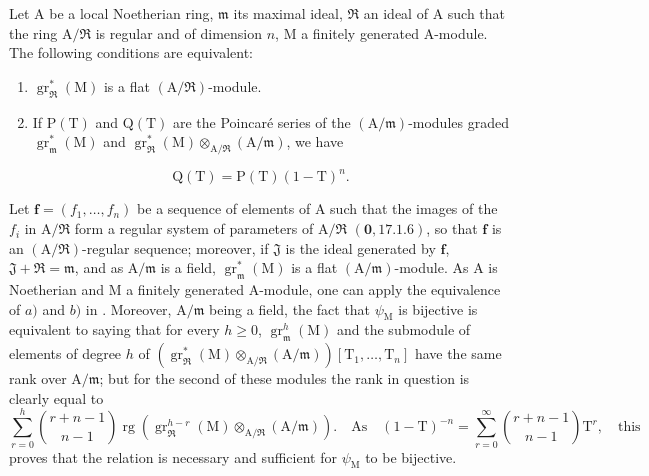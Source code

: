 \begin{corollary}[19.7.3]
\label{IV.19.7.3}
Let $\mathrm{A}$ be a local Noetherian ring, $\mathfrak{m}$ its maximal ideal, $\mathfrak{R}$ an ideal of $\mathrm{A}$ such that the ring $\mathrm{A}/\mathfrak{R}$ is regular and of dimension $n$, $\mathrm{M}$ a finitely generated $\mathrm{A}$-module. The following conditions are equivalent:
\begin{enumerate}
\item[\rm a)] $\operatorname{gr}_\mathfrak{R}^*(\mathrm{M})$ is a flat $(\mathrm{A}/\mathfrak{R})$-module.
\item[\rm b)] If $\mathrm{P}(\mathrm{T})$ and $\mathrm{Q}(\mathrm{T})$ are the Poincar\'e series of the $(\mathrm{A}/\mathfrak{m})$-modules graded $\operatorname{gr}_\mathfrak{m}^*(\mathrm{M})$ and $\operatorname{gr}_\mathfrak{R}^*(\mathrm{M})\otimes_{\mathrm{A}/\mathfrak{R}}(\mathrm{A}/\mathfrak{m})$, we have
\end{enumerate}
\begin{equation}
  \mathrm{Q}(\mathrm{T})=\mathrm{P}(\mathrm{T})(1-\mathrm{T})^n.
  \tag{19.7.3.1}
\label{IV.19.7.3.1}
\end{equation}

Let $\mathbf{f}=(f_1,\ldots,f_n)$ be a sequence of elements of $\mathrm{A}$ such that the images of the $f_i$ in $\mathrm{A}/\mathfrak{R}$ form a regular system of parameters of $\mathrm{A}/\mathfrak{R}$ $(\mathbf{0},17.1.6)$, so that $\mathbf{f}$ is an $(\mathrm{A}/\mathfrak{R})$-regular sequence; moreover, if $\mathfrak{J}$ is the ideal generated by $\mathbf{f}$, $\mathfrak{J}+\mathfrak{R}=\mathfrak{m}$, and as $\mathrm{A}/\mathfrak{m}$ is a field, $\operatorname{gr}_\mathfrak{m}^*(\mathrm{M})$ is a flat $(\mathrm{A}/\mathfrak{m})$-module. As $\mathrm{A}$ is Noetherian and $\mathrm{M}$ a finitely generated $\mathrm{A}$-module, one can apply the equivalence of $a)$ and $b)$ in . Moreover, $\mathrm{A}/\mathfrak{m}$ being a field, the fact that $\psi_\mathrm{M}$ is bijective is equivalent to saying that for every $h\geqslant 0$, $\operatorname{gr}_\mathfrak{m}^h(\mathrm{M})$ and the submodule of elements of degree $h$ of $(\operatorname{gr}_\mathfrak{R}^*(\mathrm{M})\otimes_{\mathrm{A}/\mathfrak{R}}(\mathrm{A}/\mathfrak{m}))[\mathrm{T}_1,\ldots,\mathrm{T}_n]$ have the same rank over $\mathrm{A}/\mathfrak{m}$; but for the second of these modules the rank in question is clearly equal to
\[
  \textstyle\sum_{r=0}^{h}\binom{r+n-1}{n-1}\operatorname{rg}(\operatorname{gr}_\mathfrak{R}^{h-r}(\mathrm{M})\otimes_{\mathrm{A}/\mathfrak{R}}(\mathrm{A}/\mathfrak{m})).\quad\text{As}\quad(1-\mathrm{T})^{-n}=\textstyle\sum_{r=0}^{\infty}\binom{r+n-1}{n-1}\mathrm{T}^r,\quad\text{this}
\]
proves that the relation  is necessary and sufficient for $\psi_\mathrm{M}$ to be bijective.
\end{corollary}

